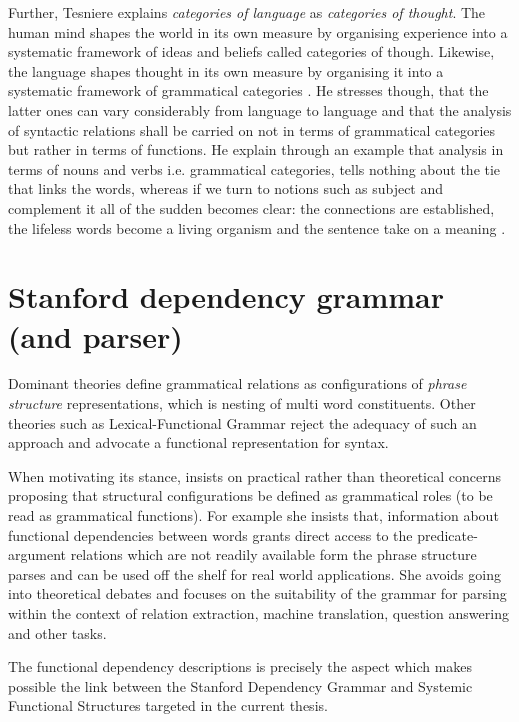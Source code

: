 Further, Tesniere explains \textit{categories of language} as \textit{categories of thought}. The human mind shapes the world in its own measure by organising experience into a systematic framework of ideas and beliefs called categories of though. Likewise, the language shapes thought in its own measure by organising it into a systematic framework of grammatical categories \citep{Tesniere2015}. He stresses though, that the latter ones can vary considerably from language to language and that the analysis of syntactic relations shall be carried on not in terms of grammatical categories but rather in terms of functions. He explain through an example that analysis in terms of nouns and verbs i.e. grammatical categories, tells nothing about the tie that links the words, whereas if we turn to notions such as subject and complement it all of the sudden becomes clear: the connections are established, the lifeless words become a living organism and the sentence take on a meaning \citep{Tesniere2015}.

\section{Stanford dependency grammar (and parser)}
Dominant \citet{Chomsky1981} theories define grammatical relations as configurations of \textit{phrase structure} representations, which is nesting of multi word constituents. Other theories such as Lexical-Functional Grammar reject the adequacy of such an approach \citep{Brensan2000} and advocate a functional representation for syntax.

When motivating its stance, \citet{Marneffe2006} insists on practical rather than theoretical concerns proposing that structural configurations be defined as grammatical roles (to be read as grammatical functions)\citep{Marneffe2006}. For example she insists that, information about functional dependencies between words grants direct access to the predicate-argument relations which are not readily available form the phrase structure parses and can be used off the shelf for real world applications. She avoids going into theoretical debates and focuses on the suitability of the grammar for parsing within the context of relation extraction, machine translation, question answering and other tasks.

The functional dependency descriptions is precisely the aspect which makes possible the link between the Stanford Dependency Grammar and Systemic Functional Structures targeted in the current thesis. 

